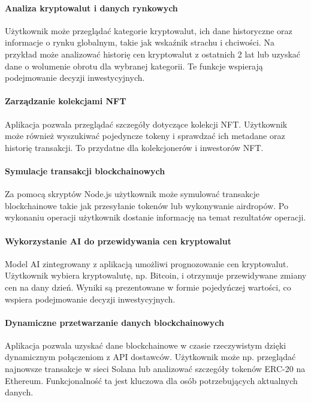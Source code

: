 \begin{itemize}
\paragraph{Analiza kryptowalut i danych rynkowych}
Użytkownik może przeglądać kategorie kryptowalut, ich dane historyczne oraz informacje o rynku globalnym, takie jak wskaźnik strachu i chciwości. Na przykład może analizować historię cen kryptowalut z ostatnich 2 lat lub uzyskać dane o wolumenie obrotu dla wybranej kategorii. Te funkcje wspierają podejmowanie decyzji inwestycyjnych.

\paragraph{Zarządzanie kolekcjami NFT}
Aplikacja pozwala przeglądać szczegóły dotyczące kolekcji NFT. Użytkownik może również wyszukiwać pojedyncze tokeny i sprawdzać ich metadane oraz historię transakcji. To przydatne dla kolekcjonerów i inwestorów NFT.

\paragraph{Symulacje transakcji blockchainowych}
Za pomocą skryptów Node.js użytkownik może symulować transakcje blockchainowe takie jak przesyłanie tokenów lub wykonywanie airdropów. Po wykonaniu operacji użytkownik dostanie informację na temat rezultatów operacji.

\paragraph{Wykorzystanie AI do przewidywania cen kryptowalut}
Model AI zintegrowany z aplikacją umożliwi prognozowanie cen kryptowalut. Użytkownik wybiera kryptowalutę, np. Bitcoin, i otrzymuje przewidywane zmiany cen na dany dzień. Wyniki są prezentowane w formie pojedyńczej wartości, co wspiera podejmowanie decyzji inwestycyjnych.

\paragraph{Dynamiczne przetwarzanie danych blockchainowych}
Aplikacja pozwala uzyskać dane blockchainowe w czasie rzeczywistym dzięki dynamicznym połączeniom z API dostawców. Użytkownik może np. przeglądać najnowsze transakcje w sieci Solana lub analizować szczegóły tokenów ERC-20 na Ethereum. Funkcjonalność ta jest kluczowa dla osób potrzebujących aktualnych danych.


\end{itemize}

